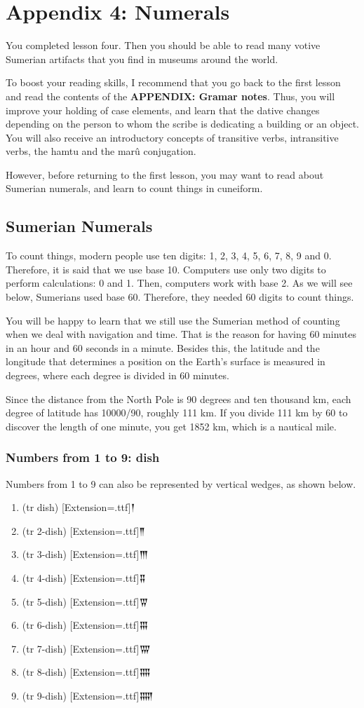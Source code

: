 \documentclass[a4paper,12pt]{book}
\newcommand{\fcm}{\large\setmainfont{Akkadian}[Extension=.ttf]}
\begin{document}
\chapter*{Appendix 4: Numerals}

You completed lesson four. Then you should
be able to read many votive Sumerian artifacts
that you find in museums around the world.

To boost your reading skills, I recommend that
you go back to the first lesson and read
the contents of the {\bf APPENDIX: Gramar notes}.
Thus, you will improve your holding of case
elements, and learn that the dative changes
depending on the person to whom the scribe
is dedicating a building or an object.
You will also receive an introductory concepts
of transitive verbs, intransitive verbs,
the hamtu and the marû conjugation.

However, before returning to the first lesson,
you may want to read about Sumerian numerals,
and learn to count things in cuneiform.

\section*{Sumerian Numerals}
To count things, modern people use ten digits:
1, 2, 3, 4, 5, 6, 7, 8, 9 and 0.
Therefore, it is said that we use base 10.
Computers use only two digits to perform
calculations: 0 and 1. Then, computers work
with base 2. As we will see below, Sumerians
used base 60. Therefore, they needed 60 digits
to count things.

You will be happy to learn that we still use
the Sumerian method of counting when we deal
with navigation and time. That is the reason
for having 60 minutes in an hour and 60 seconds
in a minute. Besides this, the latitude and
the longitude that determines a position on
the Earth's surface is measured in degrees,
where each degree is divided in 60 minutes.

Since the distance from the North Pole
is 90 degrees and ten thousand km, each
degree of latitude has 10000/90,
roughly 111 km. If you divide 111 km
by 60 to discover the length of one minute,
you get 1852 km, which is a nautical mile.

\newpage
\subsection*{Numbers from 1 to 9: dish}
Numbers from 1 to 9 can also be represented
by vertical wedges, as shown below.
\begin{enumerate}
\item (tr dish) {\fcm 𒁹}  
\item (tr 2-dish) {\fcm 𒈫}  
\item (tr 3-dish) {\fcm 𒐈} 
\item (tr 4-dish) {\fcm 𒐉} 
\item (tr 5-dish) {\fcm 𒐊} 
\item (tr 6-dish) {\fcm 𒐋} 
\item (tr 7-dish) {\fcm 𒐌} 
\item (tr 8-dish) {\fcm 𒐍} 
\item (tr 9-dish) {\fcm 𒐎}
\end{enumerate}
\end{document}
